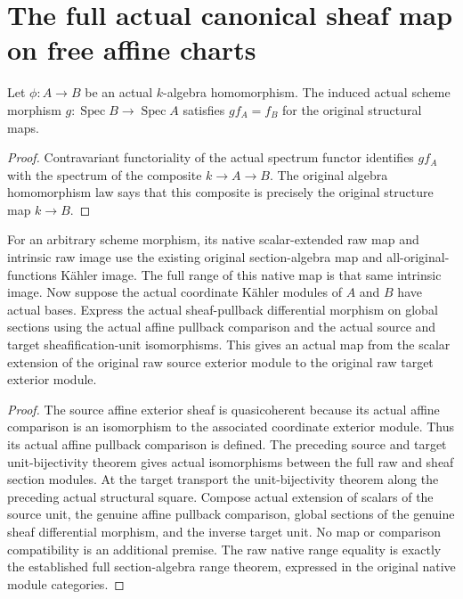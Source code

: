 \section{The full actual canonical sheaf map on free affine charts}

\begin{lemma}\label{sc0-affine-canonical-sheaf-image:structure}
\leanok
Let $\phi:A\to B$ be an actual $k$-algebra homomorphism. The induced actual scheme morphism $g:\operatorname{Spec}B\to\operatorname{Spec}A$ satisfies $g f_A=f_B$ for the original structural maps.
\end{lemma}
\begin{proof}
Contravariant functoriality of the actual spectrum functor identifies $g f_A$ with the spectrum of the composite $k\to A\to B$. The original algebra homomorphism law says that this composite is precisely the original structure map $k\to B$.
\end{proof}

\begin{definition}\label{sc0-affine-canonical-sheaf-image:map}
\leanok
{}
For an arbitrary scheme morphism, its native scalar-extended raw map and intrinsic raw image use the existing original section-algebra map and all-original-functions Kähler image. The full range of this native map is that same intrinsic image. Now suppose the actual coordinate Kähler modules of $A$ and $B$ have actual bases. Express the actual sheaf-pullback differential morphism on global sections using the actual affine pullback comparison and the actual source and target sheafification-unit isomorphisms. This gives an actual map from the scalar extension of the original raw source exterior module to the original raw target exterior module.
\end{definition}
\begin{proof}
The source affine exterior sheaf is quasicoherent because its actual affine comparison is an isomorphism to the associated coordinate exterior module. Thus its actual affine pullback comparison is defined. The preceding source and target unit-bijectivity theorem gives actual isomorphisms between the full raw and sheaf section modules. At the target transport the unit-bijectivity theorem along the preceding actual structural square. Compose actual extension of scalars of the source unit, the genuine affine pullback comparison, global sections of the genuine sheaf differential morphism, and the inverse target unit. No map or comparison compatibility is an additional premise. The raw native range equality is exactly the established full section-algebra range theorem, expressed in the original native module categories.
\end{proof}

